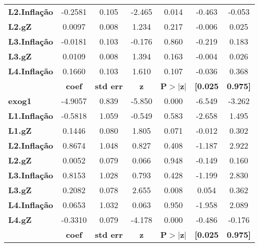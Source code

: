\begin{center}
\begin{tabular}{lcccccc}
\textbf{L2.Inflação} &      -0.2581  &        0.105     &    -2.465  &         0.014        &       -0.463    &       -0.053     \\
\textbf{L2.gZ}       &       0.0097  &        0.008     &     1.234  &         0.217        &       -0.006    &        0.025     \\
\textbf{L3.Inflação} &      -0.0181  &        0.103     &    -0.176  &         0.860        &       -0.219    &        0.183     \\
\textbf{L3.gZ}       &       0.0109  &        0.008     &     1.394  &         0.163        &       -0.004    &        0.026     \\
\textbf{L4.Inflação} &       0.1660  &        0.103     &     1.610  &         0.107        &       -0.036    &        0.368     \\
                     & \textbf{coef} & \textbf{std err} & \textbf{z} & \textbf{P$> |$z$|$} & \textbf{[0.025} & \textbf{0.975]}  \\
\midrule
\textbf{exog1}       &      -4.9057  &        0.839     &    -5.850  &         0.000        &       -6.549    &       -3.262     \\
\textbf{L1.Inflação} &      -0.5818  &        1.059     &    -0.549  &         0.583        &       -2.658    &        1.495     \\
\textbf{L1.gZ}       &       0.1446  &        0.080     &     1.805  &         0.071        &       -0.012    &        0.302     \\
\textbf{L2.Inflação} &       0.8674  &        1.048     &     0.827  &         0.408        &       -1.187    &        2.922     \\
\textbf{L2.gZ}       &       0.0052  &        0.079     &     0.066  &         0.948        &       -0.149    &        0.160     \\
\textbf{L3.Inflação} &       0.8153  &        1.028     &     0.793  &         0.428        &       -1.199    &        2.830     \\
\textbf{L3.gZ}       &       0.2082  &        0.078     &     2.655  &         0.008        &        0.054    &        0.362     \\
\textbf{L4.Inflação} &       0.0653  &        1.032     &     0.063  &         0.950        &       -1.958    &        2.089     \\
\textbf{L4.gZ}       &      -0.3310  &        0.079     &    -4.178  &         0.000        &       -0.486    &       -0.176     \\
             & \textbf{coef} & \textbf{std err} & \textbf{z} & \textbf{P$> |$z$|$} & \textbf{[0.025} & \textbf{0.975]}  \\

\end{tabular}
\end{center}
